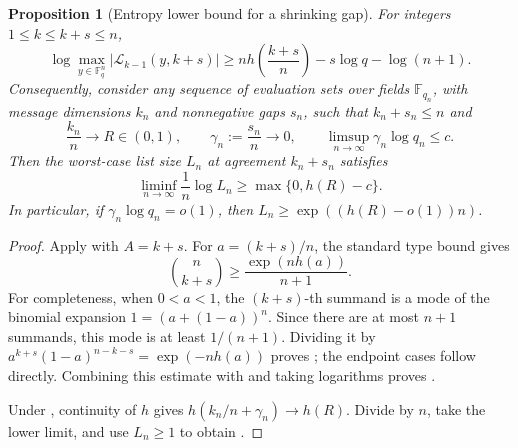 \documentclass[11pt,letterpaper]{article}
\newtheorem{proposition}[proposition]{Proposition}
\theoremstyle{definition}
\newcommand{\F}{\mathbb{F}}
\newcommand{\List}{\mathcal{L}}
\begin{document}
\begin{proposition}[Entropy lower bound for a shrinking gap]
\label{prop:shrinking-gap-entropy}
For integers \(1\leq k\leq k+s\leq n\),
\begin{equation}
  \log\max_{y\in\F_q^n}
  \bigl|\List_{k-1}(y,k+s)\bigr|
  \geq
  n h\left(\frac{k+s}{n}\right)
  -s\log q-\log(n+1).
  \label{eq:shrinking-gap-entropy-bound}
\end{equation}
Consequently, consider any sequence of evaluation sets over fields
\(\F_{q_n}\), with message dimensions \(k_n\) and nonnegative gaps \(s_n\),
such that \(k_n+s_n\le n\) and
\begin{equation}
  \frac{k_n}{n}\longrightarrow R\in(0,1),
  \qquad
  \gamma_n:=\frac{s_n}{n}\longrightarrow0,
  \qquad
  \limsup_{n\to\infty}\gamma_n\log q_n\leq c.
  \label{eq:shrinking-gap-asymptotic-hypotheses}
\end{equation}
Then the worst-case list size \(L_n\) at agreement \(k_n+s_n\) satisfies
\begin{equation}
  \liminf_{n\to\infty}\frac{1}{n}\log L_n
  \geq \max\{0,h(R)-c\}.
  \label{eq:shrinking-gap-asymptotic-bound}
\end{equation}
In particular, if \(\gamma_n\log q_n=o(1)\), then
\(L_n\geq\exp((h(R)-o(1))n)\).
\end{proposition}

\begin{proof}
Apply  with \(A=k+s\).  For
\(a=(k+s)/n\), the standard type bound gives
\begin{equation}
  \binom{n}{k+s}\geq\frac{\exp(nh(a))}{n+1}.
  \label{eq:binomial-type-lower-bound}
\end{equation}
For completeness, when \(0<a<1\), the \((k+s)\)-th summand is a mode of the
binomial expansion
\(1=(a+(1-a))^n\).  Since there are at most \(n+1\) summands, this mode is at
least \(1/(n+1)\).  Dividing it by
\(a^{k+s}(1-a)^{n-k-s}=\exp(-nh(a))\) proves
; the endpoint cases follow directly.
Combining this estimate with
 and taking logarithms proves
.

Under , continuity of \(h\)
gives \(h(k_n/n+\gamma_n)\to h(R)\).  Divide
 by \(n\), take the lower limit, and use
\(L_n\geq1\) to obtain .
\end{proof}
\end{document}
